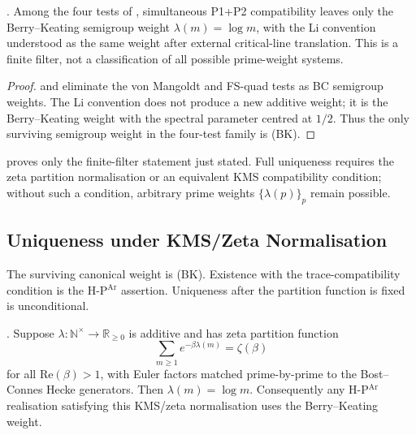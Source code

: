 \begin{theorem}
\label{v4-arith:hpar-det:thm:two-cancellations}
\ClaimStatusProvedHere. Among the four tests of
, simultaneous P1+P2
compatibility leaves only the Berry--Keating semigroup weight
\(\lambda(m)=\log m\), with the Li convention understood as the same
weight after external critical-line translation. This is a finite
filter, not a classification of all possible prime-weight systems.
\end{theorem}

\begin{proof}
 and
 eliminate the von Mangoldt and
FS-quad tests as BC semigroup weights. The Li convention does not
produce a new additive weight; it is the Berry--Keating weight with the
spectral parameter centred at \(1/2\). Thus the only surviving
semigroup weight in the four-test family is (BK).
\end{proof}

\begin{remark}
\label{v4-arith:hpar-det:rem:BK-survivor}
 proves only the
finite-filter statement just stated. Full uniqueness requires the
zeta partition normalisation or an equivalent KMS compatibility
condition; without such a condition, arbitrary prime weights
\(\{\lambda(p)\}_{p}\) remain possible.
\end{remark}

\subsection{Uniqueness under KMS/Zeta Normalisation}
\label{v4-arith:hpar-det:uniqueness-given-existence}

The surviving canonical weight is (BK). Existence with the
trace-compatibility condition is the H-P\(^{\mathrm{Ar}}\) assertion.
Uniqueness after the partition function is fixed is unconditional.

\begin{theorem}
\label{v4-arith:hpar-det:thm:uniqueness-given-existence}
\ClaimStatusProvedHere. Suppose
\(\lambda:\mathbb{N}^{\times}\to\mathbb{R}_{\geq0}\) is additive and
has zeta partition function
\[
 \sum_{m\geq1}e^{-\beta\lambda(m)}=\zeta(\beta)
\]
for all \(\mathrm{Re}(\beta)>1\), with Euler factors matched
prime-by-prime to the Bost--Connes Hecke generators. Then
\(\lambda(m)=\log m\). Consequently any H-P\(^{\mathrm{Ar}}\)
realisation satisfying this KMS/zeta normalisation uses the
Berry--Keating weight.
\end{theorem}

